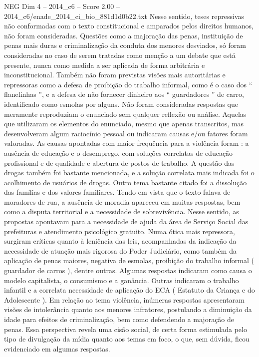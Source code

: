 \begin{textsample}{NEG Dim 4 – 2014\_c6 – Score 2.00 – 2014\_c6/enade\_2014\_ci\_bio\_881d1d0b22.txt}
Nesse sentido, teses repressivas não conformadas com o texto constitucional e amparados pelos direitos humanos, não foram consideradas.
Questões como a majoração das penas, instituição de penas mais duras e criminalização da conduta dos menores desviados, só foram consideradas no caso de serem tratadas como menção a um debate que está presente, nunca como medida a ser aplicada de forma arbitrária e inconstitucional.
Também não foram previstas visões mais autoritárias e repressoras como a defesa de proibição do trabalho informal, como é o caso dos “ flanelinhas ”, e a defesa de não fornecer dinheiro aos “ guardadores ” de carro, identificado como esmolas por alguns.
Não foram consideradas respostas que meramente reproduziam o enunciado sem qualquer reflexão ou análise.
Aquelas que utilizaram os elementos do enunciado, mesmo que apenas transcritos, mas desenvolveram algum raciocínio pessoal ou indicaram causas e/ou fatores foram valoradas.
As causas apontadas com maior frequência para a violência foram : a ausência de educação e o desemprego, com soluções correlatas de educação profissional e de qualidade e abertura de postos de trabalho.
A questão das drogas também foi bastante mencionada, e a solução correlata mais indicada foi o acolhimento de usuários de drogas.
Outro tema bastante citado foi a dissolução das famílias e dos valores familiares.
Tendo em vista que o texto falava de moradores de rua, a ausência de moradia apareceu em muitas respostas, bem como a disputa territorial e a necessidade de sobrevivência.
Nesse sentido, as propostas apontavam para a necessidade de ajuda da área de Serviço Social das prefeituras e atendimento psicológico gratuito.
Numa ótica mais repressora, surgiram críticas quanto à leniência das leis, acompanhadas da indicação da necessidade de atuação mais rigorosa do Poder Judiciário, como também da aplicação de penas maiores, negativa de esmolas, proibição do trabalho informal ( guardador de carros ), dentre outras.
Algumas respostas indicaram como causa o modelo capitalista, o consumismo e a ganância.
Outras indicaram o trabalho infantil e a correlata necessidade de aplicação do ECA ( Estatuto da Criança e do Adolescente ).
Em relação ao tema violência, inúmeras respostas apresentaram visões de intolerância quanto aos menores infratores, postulando a diminuição da idade para efeitos de criminalização, bem como defendendo a majoração de penas.
Essa perspectiva revela uma cisão social, de certa forma estimulada pelo tipo de divulgação da mídia quanto aos temas em foco, o que, sem dúvida, ficou evidenciado em algumas respostas.

\end{textsample}
